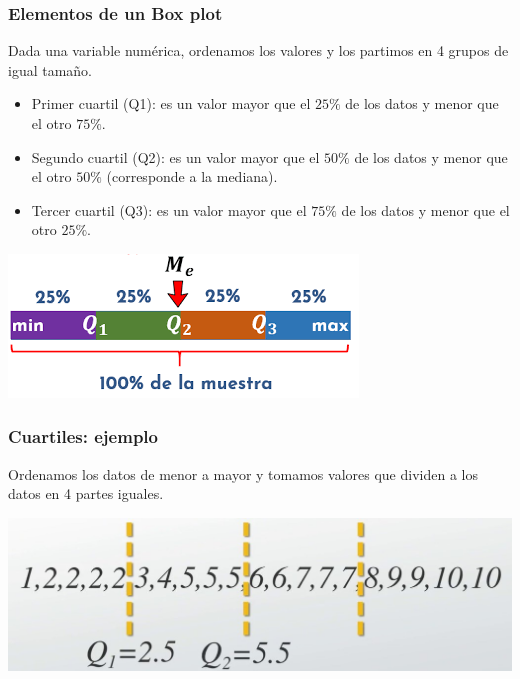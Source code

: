 \documentclass[aspectratio=169,12pt]{beamer}
\begin{document}
\begin{frame}
\frametitle{Elementos de un Box plot}

Dada una variable numérica, ordenamos los valores y los partimos en 4 grupos de igual tamaño.

\begin{itemize}
\item Primer cuartil (Q1): es un valor mayor que el $25\%$ de los datos y menor que el otro $75\%$.
\item Segundo cuartil (Q2): es un valor mayor que el $50\%$ de los datos y menor que el otro $50\%$ (corresponde a la mediana).
\item Tercer cuartil (Q3): es un valor mayor que el $75\%$ de los datos y menor que el otro $25\%$.
\end{itemize}

\begin{center}
\includegraphics[scale=.5]{clase4-cuartiles-esquema.png}
\end{center}




\end{frame}


\begin{frame}
\frametitle{Cuartiles: ejemplo}

Ordenamos los datos de menor a mayor y tomamos valores que dividen a los datos en 4 partes iguales.

\begin{center}
\includegraphics[scale=.3]{clase4-cuartiles-Q1yQ2.jpg}
\end{center}

\end{frame}
\end{document}
